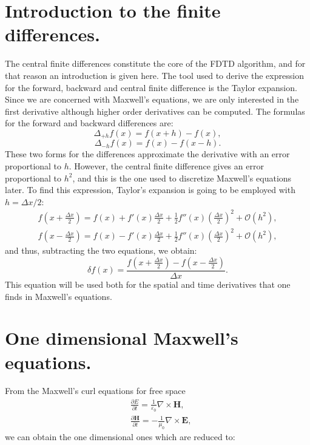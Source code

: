 \documentclass[12pt, oneside]{book}
\begin{document}
\section{Introduction to the finite differences.}
The central finite differences \cite{li2017numerical} constitute the core of the FDTD algorithm, and for that reason an introduction is given here. The tool used to derive the expression for the forward, backward and central finite difference is the Taylor expansion. Since we are concerned with Maxwell's equations, we are only interested in the first derivative although higher order derivatives can be computed. 
The formulas for the forward and backward differences are:
\begin{equation}
\Delta_{+h} f(x)= f(x+h) - f(x),
\end{equation}
\begin{equation}
\Delta_{-h} f(x)= f(x) - f(x-h).
\end{equation}
These two forms for the differences approximate the derivative with an error proportional to $h$. However, the central finite difference gives an error proportional to $h^2$, and this is the one used to discretize Maxwell's equations later. To find this expression, Taylor's expansion is going to be employed with $h=\Delta x /2$:
\begin{equation}
\begin{aligned}
f\left(x+\frac{\Delta x}{2}\right)=f(x)+f'(x)\frac{\Delta x}{2}+ \frac{1}{2} f''(x)\left( \frac{\Delta x}{2} \right)^2 + \mathcal{O}\left(h^{2}\right), \\
f\left(x-\frac{\Delta x}{2}\right)=f(x)-f'(x)\frac{\Delta x}{2}+ \frac{1}{2} f''(x)\left( \frac{\Delta x}{2} \right)^2 + \mathcal{O}\left(h^{2}\right),
\end{aligned}
\end{equation}
and thus, subtracting the two equations, we obtain:
\begin{equation}
\delta f(x)= \frac{f\left(x+\frac{\Delta x}{2}\right)-f\left(x-\frac{\Delta x}{2}\right)}{\Delta x}.
\end{equation}
This equation will be used both for the spatial and time derivatives that one finds in Maxwell's equations.


\section{One dimensional Maxwell's equations.}
From the Maxwell's curl equations for free space
\begin{equation}
\begin{aligned}
&\frac{\partial E}{\partial t}=\frac{1}{\varepsilon_{0}} \nabla \times \boldsymbol{H}, \\
&\frac{\partial \boldsymbol{H}}{\partial t}=-\frac{1}{\mu_{0}} \nabla \times \boldsymbol{E},
\end{aligned}
\end{equation}
we can obtain the one dimensional ones which are reduced to:
\end{document}
